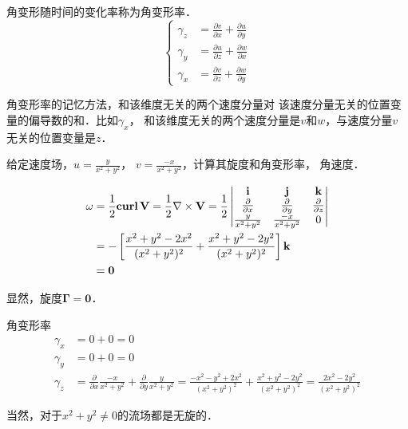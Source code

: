 角变形随时间的变化率称为角变形率．
\begin{equation*}
	\begin{cases}
		\gamma_z & = \frac{\partial v}{\partial x}+
		\frac{\partial u}{\partial y}                \\
		\gamma_y & = \frac{\partial u}{\partial z}+
		\frac{\partial w}{\partial x}                \\
		\gamma_x & = \frac{\partial v }{\partial z}+
		\frac{\partial w}{\partial y}
	\end{cases}
\end{equation*}
\begin{note}
	角变形率的记忆方法，和该维度无关的两个速度分量对
	该速度分量无关的位置变量的偏导数的和．比如$\gamma_x$，
	和该维度无关的两个速度分量是$v$和$w$，与速度分量$v$
	无关的位置变量是$z$．
\end{note}
\begin{example}
	给定速度场，$u=\frac{y }{x^2+y^2}$，
	$v=\frac{-x }{x^2+y^2}$，计算其旋度和角变形率，
	角速度．

  \begin{equation*}
    \begin{split}
      \mathbf{\omega}&=\frac{1}{2 }\mathbf{curl}\, \mathbf{V}
      =\frac{1}{2}\nabla \times \mathbf{V}=
		\frac{1}{2}
		\begin{vmatrix}
			\mathbf{i}                  & \mathbf{j}                  & \mathbf{k} \\
			\frac{\partial}{\partial x} &
      \frac{\partial}{\partial y} &
		  \frac{\partial}{\partial z}              \\
			\frac{y }{x^2+y^2}          & \frac{-x }{x^2+y^2}         & 0          \\
		\end{vmatrix}\\ 
                     &=-
    \left[\frac{x^2+y^2-2x^2}{(x^2+y^2)^2}+
      \frac{x^2+y^2-2y^2}{(x^2+y^2)^2}\right]
      \mathbf{k}\\
                     &=\mathbf{0}
  \end{split}
\end{equation*}

显然，旋度$\mathbf{\Gamma}=\mathbf{0}$．

角变形率
\begin{equation*}
  \begin{split}
    \gamma_x&= 0+0=0\\ 
    \gamma_y&= 0+0=0 \\ 
    \gamma_z&= \frac{\partial}{\partial x}
    \frac{-x }{x^2+y^2}+
    \frac{\partial}{\partial y}
    \frac{y }{x^2+y^2}
    =\frac{-x^2-y^2+2x^2}{(x^2+y^2)^2}+
    \frac{x^2+y^2-2y^2}{(x^2+y^2)^2}
    =\frac{2x^2-2y^2}{(x^2+y^2)^2}
  \end{split}
\end{equation*}

当然，对于$x^2+y^2\neq 0$的流场都是无旋的．
\end{example}

